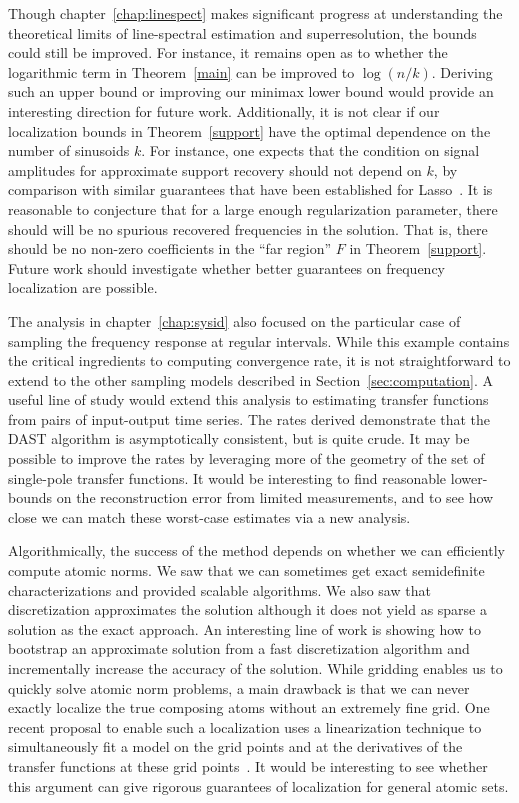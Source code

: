 Though chapter~\ref{chap:linespect} makes significant progress at understanding
the theoretical limits of line-spectral estimation and superresolution, the
bounds could still be improved. For instance, it remains open as to whether the
logarithmic term in Theorem~\ref{main} can be improved to $\log(n/k)$. Deriving
such an upper bound or improving our minimax lower bound would provide an
interesting direction for future work. Additionally, it is not clear if our
localization bounds in Theorem~\ref{support} have the optimal dependence on the
number of sinusoids $k$. For instance, one expects that the condition on signal
amplitudes for approximate support recovery should not depend on $k$, by
comparison with similar guarantees that have been established for
Lasso~\cite{coherence}. It is reasonable to conjecture that for a large enough
regularization parameter, there should will be no spurious recovered frequencies
in the solution. That is, there should be no non-zero coefficients in the ``far
region'' $F$ in Theorem~\ref{support}. Future work should investigate whether
better guarantees on frequency localization are possible.

The analysis in chapter~\ref{chap:sysid} also focused on the particular case of
sampling the frequency response at regular intervals. While this example
contains the critical ingredients to computing convergence rate, it is not
straightforward to extend to the other sampling models described in
Section~\ref{sec:computation}. A useful line of study would extend this analysis
to estimating transfer functions from pairs of input-output time series. The
rates derived demonstrate that the DAST algorithm is asymptotically consistent,
but is quite crude. It may be possible to improve the rates by leveraging more
of the geometry of the set of single-pole transfer functions. It would be
interesting to find reasonable lower-bounds on the reconstruction error from
limited measurements, and to see how close we can match these worst-case
estimates via a new analysis.

Algorithmically, the success of the method depends on whether we can efficiently
compute atomic norms. We saw that we can sometimes get exact semidefinite
characterizations and provided scalable algorithms. We also saw that
discretization approximates the solution although it does not yield as sparse a
solution as the exact approach. An interesting line of work is showing how to
bootstrap an approximate solution from a fast discretization algorithm and
incrementally increase the accuracy of the solution. While gridding enables us
to quickly solve atomic norm problems, a main drawback is that we can never
exactly localize the true composing atoms without an extremely fine grid. One
recent proposal to enable such a localization uses a linearization technique to
simultaneously fit a model on the grid points and at the derivatives of the
transfer functions at these grid points~\cite{Simoncelli11}. It would be
interesting to see whether this argument can give rigorous guarantees of
localization for general atomic sets.

